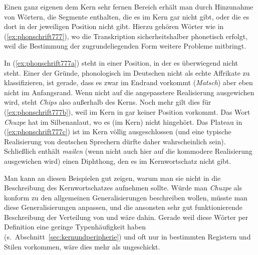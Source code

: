 Einen ganz eigenen dem Kern sehr fernen Bereich erhält man durch Hinzunahme von Wörtern, die Segmente enthalten, die es im Kern gar nicht gibt, oder die es dort in der jeweiligen Position nicht gibt.
Hierzu gehören Wörter wie in (\ref{ex:phonschrift777}), wo die Transkription sicherheitshalber phonetisch erfolgt, weil die Bestimmung der zugrundeliegenden Form weitere Probleme mitbringt.

\begin{exe}
  \ex\label{ex:phonschrift777}
  \begin{xlist}
  \end{xlist}
\end{exe}

In (\ref{ex:phonschrift777a}) steht \textipa{[\t{tS}]} in einer Position, in der es überwiegend nicht steht.
Einer der Gründe, phonologisch \textipa{[\t{tS}]} im Deutschen nicht als echte Affrikate zu klassifizieren, ist gerade, dass es zwar im Endrand vorkommt (\textit{Matsch}) aber eben nicht im Anfangsrand.
Wenn nicht auf die angepasstere Realisierung \textipa{[SIps]} ausgewichen wird, steht \textit{Chips} also außerhalb des Kerns.
Noch mehr gilt dies für (\ref{ex:phonschrift777b}), weil \textipa{[\t{dZ}]} im Kern in gar keiner Position vorkommt.
Das Wort \textit{Chuzpe} hat \textipa{[X]} im Silbenanlaut, wo es (im Kern) nicht hingehört.
Das Plateau \textipa{[pt]} in (\ref{ex:phonschrift777c}) ist im Kern völlig ausgeschlossen (und eine typische Realisierung von deutschen Sprechern dürfte daher wahrscheinlich \textipa{[p@tEKanodOn]} sein).
Schließlich enthält \textit{mailen} (wenn nicht auch hier auf die kommodere Realisierung \textipa{[me:l@n]} ausgewichen wird) einen Diphthong, den es im Kernwortschatz nicht gibt.

Man kann an diesen Beispielen gut zeigen, warum man sie nicht in die Beschreibung des Kernwortschatzes aufnehmen sollte.
Würde man \textit{Chuzpe} \zB als konform zu den allgemeinen Generalisierungen beschreiben wollen, müsste man diese Generalisierungen anpassen, und die ansonsten sehr gut funktionierende Beschreibung der Verteilung von \textipa{[\c{c}]} und \textipa{[X]} wäre dahin.
Gerade weil diese Wörter per Definition eine geringe Typenhäufigkeit haben (s.\ Abschnitt~\ref{sec:kernundperipherie}) und oft nur in bestimmten Registern und Stilen vorkommen, wäre dies mehr als ungeschickt.

